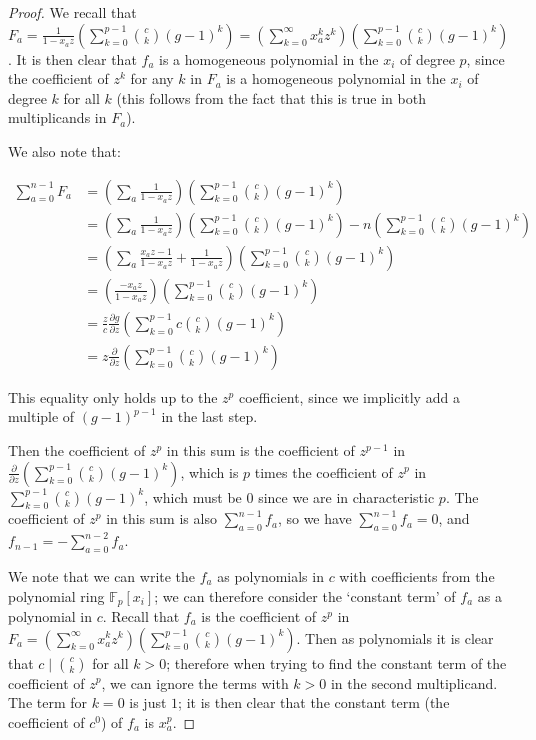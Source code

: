 \documentclass{article}
\numberwithin{equation}{section}
\begin{document}
\begin{proof} 
We recall that $F_a=\frac{1}{1-x_az}\left(\sum_{k=0}^{p-1} \binom{c}{k} (g-1)^k\right)=\left(\sum_{k=0}^\infty x_a^kz^k\right)\left(\sum_{k=0}^{p-1} \binom{c}{k} (g-1)^k\right)$. It is then clear that $f_a$ is a homogeneous polynomial in the $x_i$ of degree $p$, since the coefficient of $z^k$ for any $k$ in $F_a$ is a homogeneous polynomial in the $x_i$ of degree $k$ for all $k$ (this follows from the fact that this is true in both multiplicands in $F_a$). 

We also note that:

\begin{align*}
\sum_{a=0}^{n-1} F_a&=\left(\sum_a \frac{1}{1-x_az}\right)\left(\sum_{k=0}^{p-1} \binom{c}{k} (g-1)^k\right)\\
&=\left(\sum_a \frac{1}{1-x_az}\right)\left(\sum_{k=0}^{p-1} \binom{c}{k} (g-1)^k\right)-n\left(\sum_{k=0}^{p-1} \binom{c}{k} (g-1)^k\right)\\
&=\left(\sum_a\frac{x_az-1}{1-x_az}+ \frac{1}{1-x_az}\right)\left(\sum_{k=0}^{p-1} \binom{c}{k} (g-1)^k\right)\\
&=\left(\frac{-x_az}{1-x_az}\right)\left(\sum_{k=0}^{p-1} \binom{c}{k} (g-1)^k\right)\\
&=\frac{z}{c}\frac{\partial g}{\partial z}\left(\sum_{k=0}^{p-1} c\binom{c}{k} (g-1)^k\right)\\
&=z\frac{\partial }{\partial z}\left(\sum_{k=0}^{p-1} \binom{c}{k} (g-1)^k\right)
\end{align*}

This equality only holds up to the $z^p$ coefficient, since we implicitly add a multiple of $(g-1)^{p-1}$ in the last step.

Then the coefficient of $z^p$ in this sum is the coefficient of $z^{p-1}$ in $\frac{\partial }{\partial z}\left(\sum_{k=0}^{p-1} \binom{c}{k} (g-1)^k\right)$, which is $p$ times the coefficient of $z^p$ in $\sum_{k=0}^{p-1} \binom{c}{k} (g-1)^k$, which must be $0$ since we are in characteristic $p$. The coefficient of $z^p$ in this sum is also $\sum_{a=0}^{n-1} f_a$, so we have $\sum_{a=0}^{n-1} f_a=0$, and $f_{n-1}=-\sum_{a=0}^{n-2} f_a$.

We note that we can write the $f_a$ as polynomials in $c$ with coefficients from the polynomial ring $\mathbb{F}_p[x_i]$; we can therefore consider the `constant term' of $f_a$ as a polynomial in $c$. Recall that $f_a$ is the coefficient of $z^p$ in $F_a=\left(\sum_{k=0}^\infty x_a^kz^k\right)\left(\sum_{k=0}^{p-1} \binom{c}{k} (g-1)^k\right)$. Then as polynomials it is clear that $c \mid \binom{c}{k}$ for all $k > 0$; therefore when trying to find the constant term of the coefficient of $z^p$, we can ignore the terms with $k > 0$ in the second multiplicand. The term for $k=0$ is just $1$; it is then clear that the constant term (the coefficient of $c^0$) of $f_a$ is $x_a^p$.


\end{proof}
\end{document}
